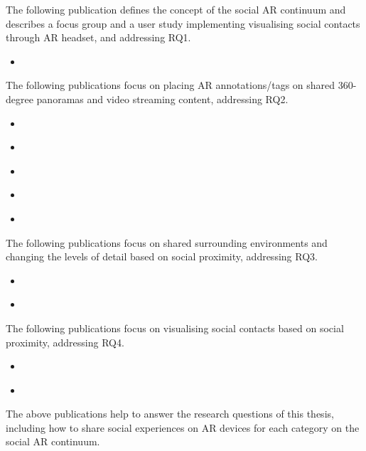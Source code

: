 The following publication defines the concept of the social AR continuum and describes a focus group and a user study implementing visualising social contacts through AR headset, and addressing RQ1. 

\begin{itemize}
    \item{ }
\end{itemize}

The following publications focus on placing AR annotations/tags on shared 360-degree panoramas and video streaming content, addressing RQ2.

\begin{itemize}
    \item{ }
    \item{ }
    \item{ }    
    \item{ }
    \item{ }
\end{itemize}

The following publications focus on shared surrounding environments and changing the levels of detail based on social proximity, addressing RQ3.

\begin{itemize}
    \item{ }
    \item{ }
\end{itemize}

The following publications focus on visualising social contacts based on social proximity, addressing RQ4. 

\begin{itemize}
    \item{ }
    \item{ }
\end{itemize}

The above publications help to answer the research questions of this thesis, including how to share social experiences on AR devices for each category on the social AR continuum. 




